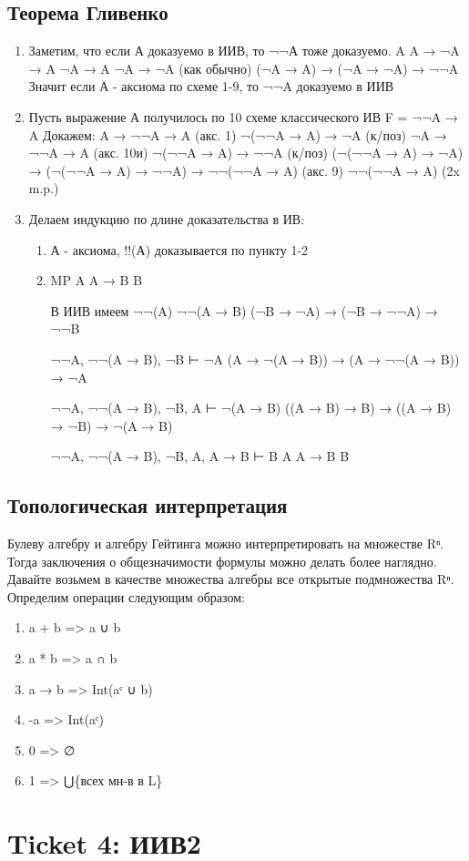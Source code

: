 \documentclass[11pt]{article}
\begin{document}
\subsection{Теорема Гливенко}
\label{sec-5-9}
\begin{enumerate}
\item Заметим, что если А доказуемо в ИИВ, то ¬¬А тоже доказуемо.
A
A → ¬A → A
¬A → A
¬A → ¬A (как обычно)
(¬A → A) → (¬A → ¬A) → ¬¬A
Значит если А - аксиома по схеме 1-9, то ¬¬A доказуемо в ИИВ
\item Пусть выражение А получилось по 10 схеме классического ИВ
F = ¬¬A → A
Докажем:
A → ¬¬A → A (акс. 1)
¬(¬¬A → A) → ¬A (к/поз)
¬A → ¬¬A → A (акс. 10и)
¬(¬¬A → A) → ¬¬A (к/поз)
(¬(¬¬A → A) → ¬A) → (¬(¬¬A → A) → ¬¬A) → ¬¬(¬¬A → A) (акс. 9)
¬¬(¬¬A → A) (2x m.p.)
\item Делаем индукцию по длине доказательства в ИВ:
\begin{enumerate}
\item А - аксиома, !!(А) доказывается по пункту 1-2
\item MP
A
A → B
B

В ИИВ имеем
¬¬(A)
¬¬(A → B)
(¬B → ¬A) → (¬B → ¬¬A) → ¬¬B

¬¬A, ¬¬(A → B), ¬B ⊢ ¬A
(A → ¬(A → B)) → (A → ¬¬(A → B)) → ¬A

¬¬A, ¬¬(A → B), ¬B, A ⊢ ¬(A → B)
((A → B) → B) → ((A → B) → ¬B) → ¬(A → B)

¬¬A, ¬¬(A → B), ¬B, A, A → B ⊢ B
A
A → B
B
\end{enumerate}
\end{enumerate}
\subsection{Топологическая интерпретация}
\label{sec-5-10}
Булеву алгебру и алгебру Гейтинга можно интерпретировать
на множестве Rⁿ. Тогда заключения о общезначимости формулы
можно делать более наглядно.
Давайте возьмем в качестве множества алгебры все открытые
подмножества Rⁿ. Определим операции следующим образом:
\begin{enumerate}
\item a + b => a ∪ b
\item a * b => a ∩ b
\item a → b => Int(aᶜ ∪ b)
\item -a => Int(aᶜ)
\item 0 => ∅
\item 1 => ⋃\{всех мн-в в L\}
\end{enumerate}
\section{Ticket 4: ИИВ2}
\label{sec-6}
\end{document}

